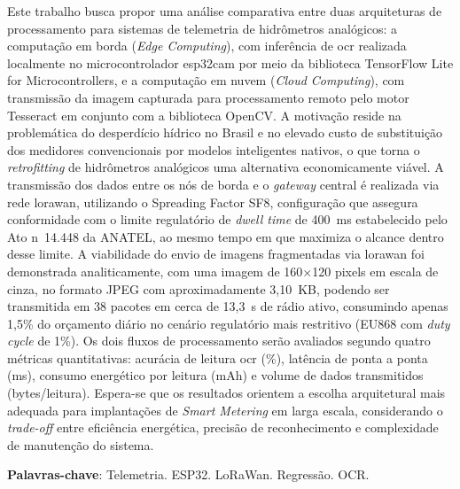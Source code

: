 \begin{resumo}
Este trabalho busca propor uma análise comparativa entre duas arquiteturas de processamento
para sistemas de telemetria de hidrômetros analógicos: a computação em borda
(\textit{Edge Computing}), com inferência de \gls{ocr} realizada localmente no microcontrolador
\gls{esp32cam} por meio da biblioteca TensorFlow Lite for Microcontrollers, e a computação
em nuvem (\textit{Cloud Computing}), com transmissão da imagem capturada para
processamento remoto pelo motor Tesseract em conjunto com a biblioteca OpenCV.
A motivação reside na problemática do desperdício hídrico no Brasil e no elevado custo de substituição dos medidores
convencionais por modelos inteligentes nativos, o que torna o \textit{\gls{retrofitting}} de
hidrômetros analógicos uma alternativa economicamente viável. A transmissão dos dados
entre os nós de borda e o \textit{gateway} central é realizada via rede \gls{lorawan},
utilizando o Spreading Factor SF8, configuração que assegura conformidade com o limite
regulatório de \textit{dwell time} de 400~ms estabelecido pelo Ato n\textordmasculine~14.448
da ANATEL, ao mesmo tempo em que maximiza o alcance dentro desse limite. A viabilidade
do envio de imagens fragmentadas via \gls{lorawan} foi demonstrada analiticamente, com
uma imagem de 160$\times$120 pixels em escala de cinza, no formato JPEG com
aproximadamente 3,10~KB, podendo ser transmitida em 38 pacotes em cerca de 13,3~s
de rádio ativo, consumindo apenas 1,5\% do orçamento diário no cenário regulatório
mais restritivo (EU868 com \textit{duty cycle} de 1\%). Os dois fluxos de processamento
serão avaliados segundo quatro métricas quantitativas: acurácia de leitura \gls{ocr} (\%),
latência de ponta a ponta (ms), consumo energético por leitura (mAh) e volume de dados
transmitidos (bytes/leitura). Espera-se que os resultados orientem a escolha arquitetural
mais adequada para implantações de \textit{Smart Metering} em larga escala, considerando
o \textit{trade-off} entre eficiência energética, precisão de reconhecimento e complexidade
de manutenção do sistema.
\vspace{\onelineskip}

\noindent
\textbf{Palavras-chave}: Telemetria. ESP32. LoRaWan. Regressão. OCR.
\end{resumo}
